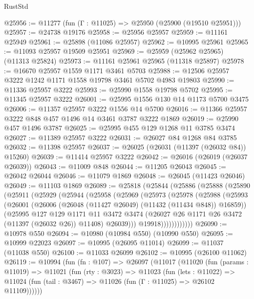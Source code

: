 \begin{lexlean}{RustStd}
\begin{coremodule}
@25956 := @11277 (fun (Γ : @11025) => @25950 (@25900 (@19510 @25951)))
@25957 := @24738 @19176
@25958 := @25956 @25957
@25959 := @11161 @25949
@25961 := @25898 (@11086 @25957)
@25962 := @10995 @25961
@25965 := @11093 @25957 @19509 @25951
@25969 := @25959 (@25962 @25965) (@11313 @25824)
@25973 := @11161 @25961 @25965 (@11318 @25897)
@25978 := @16670 @25957 @1559 @1171 @3461 @5703
@25988 := @12506 @25957 @3222 @1242 @1171 @1558 @19798 @3461 @5702 @4983 @19803
@25990 := @11336 @25957 @3222
@25993 := @25990 @1558 @19798 @5702
@25995 := @11345 @25957 @3222
@26001 := @25995 @1556 @130 @14 @1173 @5700 @3475
@26006 := @11357 @25957 @3222 @1556 @14 @5700
@26016 := @11366 @25957 @3222 @848 @457 @1496 @14 @3461 @3787 @3222 @1869
@26019 := @25990 @457 @1496 @3787
@26025 := @25995 @455 @129 @1268 @11 @3785 @3474
@26027 := @11389 @25957 @3222
@26031 := @26027 @84 @1268 @84 @3785
@26032 := @11398 @25957
@26037 := @26025 (@26031 (@11397 (@26032 @84)) @15260)
@26039 := @11414 @25957 @3222
@26042 := @26016 (@26019 (@26037 @26039))
@26043 := @11009 @848
@26044 := @11205 @26043
@26045 := @26042 @26044
@26046 := @11079 @1869
@26048 := @26045 (@11423 @26046)
@26049 := @11103 @1869
@26089 := @25818
    (@25844
      (@25886
        (@25888
          (@25890
            (@25911
              (@25929
                (@25944
                  (@25958
                    (@25969
                      (@25973
                        (@25978
                          (@25988
                            (@25993
                              (@26001
                                (@26006 (@26048 (@11427 @26049) (@11432 (@11434 @848)) @16859))
                                (@25995
                                  @127
                                  @129
                                  @1171
                                  @11
                                  @3472
                                  @3474
                                  (@26027 @26 @1171 @26 @3472 (@11397 (@26032 @26)) @11408)
                                  @26039)))
                            @19918))))))))))))
@26090 := @10978 @550
@26094 := @10980 (@10984 @550) (@10990 @550)
@26095 := @10999 @22023
@26097 := @10995 (@26095 @11014)
@26099 := @11037 (@11038 @550)
@26100 := @11033 @26099
@26102 := @10995 (@26100 @11062)
@26119 := @10994
    (fun (fn : @107) =>
    @26097
      (@11017
        (@11020
          (fun (params : @11019) =>
          @11021
            (fun (rty : @3023) =>
            @11023
              (fun (lets : @11022) =>
              @11024 (fun (tail : @3467) => @11026 (fun (Γ : @11025) => @26102 @11109))))))

\end{coremodule}
\end{lexlean}
